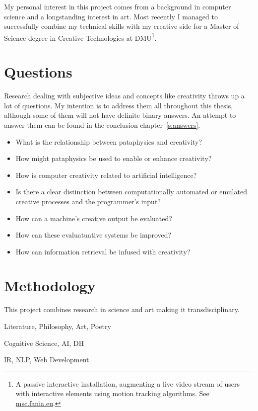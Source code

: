 \spirals

My personal interest in this project comes from a background in computer science and a longstanding interest in art. Most recently I managed to successfully combine my technical skills with my creative side for a Master of Science degree in Creative Technologies at \ac{DMU}\footnote{A passive interactive installation, augmenting a live video stream of users with interactive elements using motion tracking algorithms. See \url{msc.fania.eu}.}. 


\section{Questions}

Research dealing with subjective ideas and concepts like creativity throws up a lot of questions. My intention is to address them all throughout this thesis, although some of them will not have definite binary answers. An attempt to answer them can be found in the conclusion chapter~\ref{s:answers}.

\begin{itemize}
  \item What is the relationship between pataphysics and creativity?
  \item How might pataphysics be used to enable or enhance creativity?
  \item How is computer creativity related to artificial intelligence?
  \item Is there a clear distinction between computationally automated or emulated creative processes and the programmer's input?
  \item How can a machine's creative output be evaluated?
  \item How can these evaluatuative systems be improved?
  \item How can information retrieval be infused with creativity?
\end{itemize}


\section{Methodology}
\label{s:intromethod}

This project combines research in science and art making it transdisciplinary.

\begin{description}[leftmargin=3cm]
  \item [Pataphysics] Literature, Philosophy, Art, Poetry
  \item [Creativity] Cognitive Science, \ac{AI}, \ac{DH}
  \item [Technology] \ac{IR}, \ac{NLP}, Web Development
\end{description}

